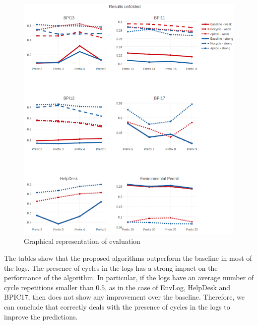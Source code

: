 \begin{figure}[!ht]
	\begin{center}  
		\includegraphics[width=\textwidth]{2_evaluation.png}
		\caption{Graphical representation of evaluation}
		\label{figure:results}
	\end{center}
\end{figure}


The tables show that the proposed algorithms outperform the baseline in most of the logs.
The presence of cycles in the logs has a strong impact on the performance of the \nocycle algorithm. In particular, if the logs have an average number of cycle repetitions smaller than $0.5$, as in the case of EnvLog, HelpDesk and BPIC17, then \nocycle does not show any improvement over the baseline. Therefore, we can conclude that \nocycle correctly deals with the presence of cycles in the logs to improve the predictions.





